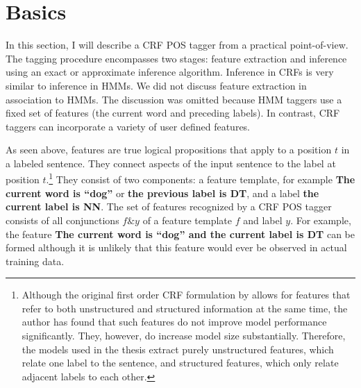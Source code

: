 \section{Basics}
\label{crf:basics}

In this section, I will describe a CRF POS tagger from a practical
point-of-view. The tagging procedure encompasses two stages: feature
extraction and inference using an exact or approximate inference
algorithm. Inference in CRFs is very similar to inference in HMMs. We
did not discuss feature extraction in association to HMMs. The
discussion was omitted because HMM taggers use a fixed set of features
(the current word and preceding labels). In contrast, CRF taggers can
incorporate a variety of user defined features.

As seen above, features are true logical propositions that apply to a
position $t$ in a labeled sentence. They connect aspects of the input
sentence to the label at position $t$.\footnote{Although the original
  first order CRF formulation by \cite{Lafferty2001} allows for
  features that refer to both unstructured and structured information
  at the same time, the author has found that such features do not
  improve model performance significantly. They, however, do increase model
  size substantially. Therefore, the models used in the thesis extract
  purely unstructured features, which relate one label to the
  sentence, and structured features, which only relate adjacent labels
  to each other.} %
They consist of two components: a feature template, for example {\bf
  The current word is ``dog''} or {\bf the previous label is DT}, and
a label {\bf the current label is NN}. The set of features recognized
by a CRF POS tagger consists of all conjunctions $f \& y$ of a feature
template $f$ and label $y$. For example, the feature {\bf The current
  word is ``dog'' and the current label is DT} can be formed although
it is unlikely that this feature would ever be observed in actual
training data.

